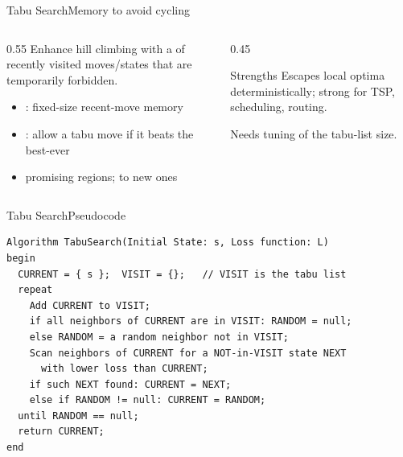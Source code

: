 \documentclass[aspectratio=169,11pt]{beamer}
\begin{document}
\begin{frame}{Tabu Search}{Memory to avoid cycling}
  \begin{columns}[T]
    \begin{column}{0.55\textwidth}
      Enhance hill climbing with a  of recently visited
      moves/states that are temporarily forbidden.
      \begin{itemize}\small
        \item {}: fixed-size recent-move memory
        \item {}: allow a tabu move if it beats the best-ever
        \item {} promising regions;  to new ones
      \end{itemize}
    \end{column}
    \begin{column}{0.45\textwidth}
      \begin{exampleblock}{Strengths}
        \small Escapes local optima deterministically; strong for TSP,
        scheduling, routing.
      \end{exampleblock}
      \centering\scriptsize Needs tuning of the tabu-list size.
    \end{column}
  \end{columns}
\end{frame}

\begin{frame}[fragile]{Tabu Search}{Pseudocode}
\begin{lstlisting}[language={}, basicstyle=\ttfamily\tiny, numbers=none,
                   xleftmargin=0.5em, framexleftmargin=0.5em]
Algorithm TabuSearch(Initial State: s, Loss function: L)
begin
  CURRENT = { s };  VISIT = {};   // VISIT is the tabu list
  repeat
    Add CURRENT to VISIT;
    if all neighbors of CURRENT are in VISIT: RANDOM = null;
    else RANDOM = a random neighbor not in VISIT;
    Scan neighbors of CURRENT for a NOT-in-VISIT state NEXT
      with lower loss than CURRENT;
    if such NEXT found: CURRENT = NEXT;
    else if RANDOM != null: CURRENT = RANDOM;
  until RANDOM == null;
  return CURRENT;
end
\end{lstlisting}
\end{frame}
\end{document}
